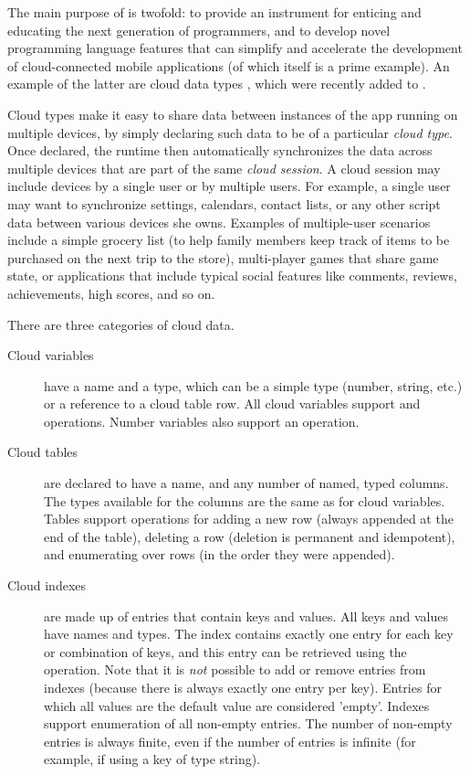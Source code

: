 \documentclass[preprint]{sigplanconf}
\begin{document}
The main purpose of \TD is twofold: to provide an instrument for enticing and educating the next generation of programmers, and to develop novel programming language features that can simplify and accelerate the development of cloud-connected mobile applications (of which \TD itself is a prime example). An example of the latter are cloud data types \cite{burckhardt2012cloud}, which were recently added to \TD. 

Cloud types make it easy to share data between instances of the app running on multiple devices, by simply declaring such data to be of a particular \emph{cloud type}. Once declared, the runtime then automatically synchronizes the data across multiple devices that are part of the same \emph{cloud session}. A cloud session may include devices by a single user or by multiple users.  For example, a single user may want to synchronize settings, calendars, contact lists, or any other script data between various devices she owns. Examples of multiple-user scenarios include a simple grocery list (to help family members keep track of items to be purchased on the next trip to the store), multi-player games that share game state, or applications that include typical social features like comments, reviews, achievements, high scores, and so on.

There are three categories of cloud data.
\begin{description}
\item[Cloud variables] have a name and a type, which can be a simple type (number, string, etc.) or a reference to a cloud table row. All cloud variables support  and  operations. Number variables also support an  operation.
\item[Cloud tables]  are declared to have a name, and any number of named, typed columns.  The types available for the columns  are the same as for cloud variables. Tables support operations for adding a new row (always appended at the end of the table), deleting a row (deletion is permanent and idempotent), and enumerating over rows (in the order they were appended). 
\item[Cloud indexes] are made up of entries that contain keys and values. All keys and values have names and types. The index contains exactly one entry for each key or combination of keys, and this entry can be retrieved using the  operation. Note that it is \emph{not} possible to add or remove entries from indexes (because there is always exactly one entry per key). Entries for which all values are the default value are considered 'empty'. Indexes support enumeration of all non-empty entries. The number of non-empty entries is always finite, even if the number of entries is infinite (for example, if using a key of type string).
\end{description}
\end{document}
